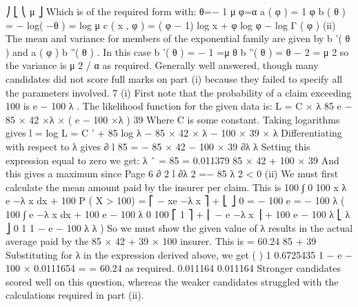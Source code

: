 \documentclass[a4paper,12pt]{article}
\begin{document}
⎠
⎣ ⎝ μ
⎦
Which is of the required form with:
θ=−
1
μ
φ=α
a ( φ ) =
1
φ
b ( θ ) = − log( −θ ) = log μ
c ( x , φ ) = ( φ − 1) log x + φ log φ − log Γ ( φ )
(ii)
The mean and variance for members of the exponential family are given by
b '( θ ) and a ( φ ) b ''( θ ) .
In this case b '( θ ) = −
1
=μ
θ
b ''( θ ) = θ − 2 = μ 2 so the variance is μ 2 / α as required.
Generally well answered, though many candidates did not score full marks on part (i)
because they failed to specify all the parameters involved.
7
(i)
First note that the probability of a claim exceeding 100 is e − 100 λ .
The likelihood function for the given data is:
L = C × λ 85 e − 85 × 42 ×λ × ( e − 100 ×λ ) 39
Where C is some constant. Taking logarithms gives
l = log L = C ' + 85 log λ − 85 × 42 × λ − 100 × 39 × λ
Differentiating with respect to λ gives
∂ l 85
=
− 85 × 42 − 100 × 39
∂λ λ
Setting this expression equal to zero we get:
λ ˆ =
85
= 0.011379
85 × 42 + 100 × 39
And this gives a maximum since
Page 6
∂ 2 l
∂λ
2
=−
85
λ 2
< 0
(ii)
We must first calculate the mean amount paid by the insurer per claim. This is
100
∫
0
100
x λ e −λ x dx + 100 P ( X > 100) = ⎡ − xe −λ x ⎤ +
⎣
⎦ 0
= − 100 e
=
− 100 λ
(
100
∫ e
−λ x
dx + 100 e − 100 λ
0
100
⎡ 1
⎤
+ ⎢ − e −λ x ⎥ + 100 e − 100 λ
⎣ λ
⎦ 0
1
1 − e − 100 λ
λ
)
So we must show the given value of λ results in the actual average paid by the
85 × 42 + 39 × 100
insurer. This is
= 60.24
85 + 39
Substituting for λ in the expression derived above, we get
(
)
1
0.6725435
1 − e − 100 × 0.0111654 =
= 60.24 as required.
0.011164
0.011164
Stronger candidates scored well on this question, whereas the weaker candidates struggled
with the calculations required in part (ii).
\end{document}
